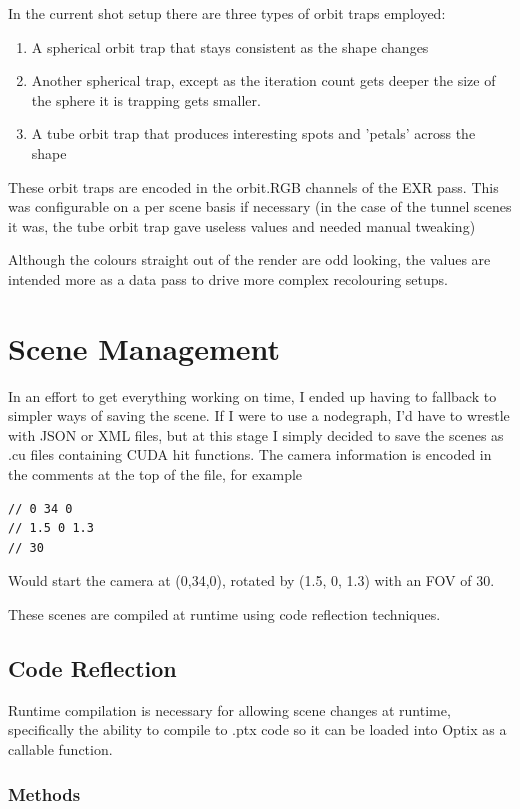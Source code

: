 \documentclass[11pt,a4paper,final,notitlepage]{report}
\begin{document}
In the current shot setup there are three types of orbit traps employed:
\begin{enumerate}
	\item A spherical orbit trap that stays consistent as the shape changes
	\item Another spherical trap, except as the iteration count gets deeper the size of the sphere it is trapping gets smaller.
	\item A tube orbit trap that produces interesting spots and 'petals' across the shape
\end{enumerate}

These orbit traps are encoded in the orbit.RGB channels of the EXR pass. This was configurable on a per scene basis if necessary (in the case of the tunnel scenes it was, the tube orbit trap gave useless values and needed manual tweaking)

Although the colours straight out of the render are odd looking, the values are intended more as a data pass to drive more complex recolouring setups.


\section{Scene Management}
In an effort to get everything working on time, I ended up having to fallback to simpler ways of saving the scene. If I were to use a nodegraph, I'd have to wrestle with JSON or XML files, but at this stage I simply decided to save the scenes as .cu files containing CUDA hit functions. The camera information is encoded in the comments at the top of the file, for example
\begin{lstlisting}
// 0 34 0
// 1.5 0 1.3
// 30
\end{lstlisting}

Would start the camera at (0,34,0), rotated by (1.5, 0, 1.3) with an FOV of 30.

These scenes are compiled at runtime using code reflection techniques.

\subsection{Code Reflection}
Runtime compilation is necessary for allowing scene changes at runtime, specifically the ability to compile to .ptx code so it can be loaded into Optix as a callable function.
\subsubsection{Methods}
\end{document}
